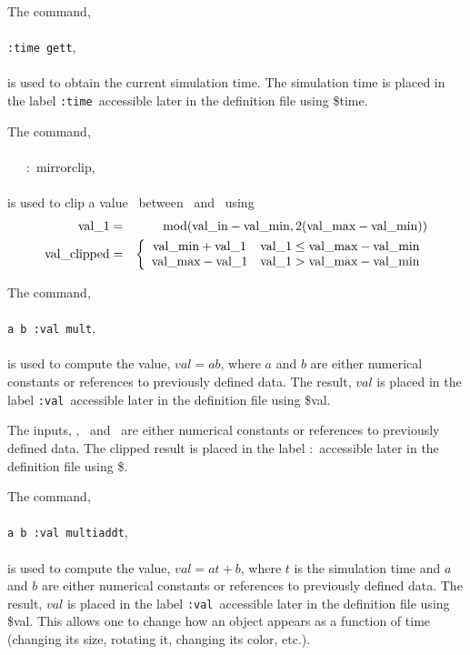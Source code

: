 \documentclass[11pt,twoside]{book}
\newcommand{\hitem}[1]{\item[{\bf #1} \hfill]}
\begin{document}
\hitem{gett}
The command, \\
\\
{\tt :time gett}, \\
\\
is used to obtain the current simulation time.
The simulation time is placed in the label {\tt :time}\ accessible later
in the definition file using \$time.

\hitem{mirrorclip}
The command, \\
\\
\valin\ \valmin\ \valmax\ :\valclipped\ mirrorclip, \\
\\
is used to clip a value \valin\ between \valmin\
and \valmax\ using
\begin{eqnarray}
{\tt \mbox{val\_1}}&=&\mbox{mod}( {\tt \mbox{val\_in}}-{\tt \mbox{val\_min}},2({\tt \mbox{val\_max}}-{\tt \mbox{val\_min}}) )\\
{\tt \mbox{val\_clipped}}&=&\left\{
\begin{array}{cc}
  {\tt \mbox{val\_min}}+{\tt \mbox{val\_1}} & {\tt \mbox{val\_1}}\le {\tt \mbox{val\_max}}-{\tt \mbox{val\_min}} \\
  {\tt \mbox{val\_max}}-{\tt \mbox{val\_1}} & {\tt \mbox{val\_1}}> {\tt \mbox{val\_max}}-{\tt \mbox{val\_min}}
\end{array}
\right.
\end{eqnarray}

\hitem{mult}
The command, \\
\\
{\tt a b :val mult}, \\
\\
is used to compute the value, $val=ab$, where $a$ and $b$ are either
numerical constants or references to previously defined data.
The result, $val$ is placed in the label {\tt :val}\ accessible
later in the definition file using \$val.

\noindent The inputs, \valin, \valmin\ and \valmax\ are either
numerical constants or references to previously defined data.
The clipped result is placed in the label :\valclipped\ accessible
later in the definition file using \$\valclipped.

\hitem{multiaddt}
The command, \\
\\
{\tt a b :val multiaddt}, \\
\\
is used to compute the value, $val=at+b$, where $t$ is the simulation
time and $a$ and $b$ are either numerical constants or references to
previously defined data. The result, $val$ is placed in the label
{\tt :val}\ accessible later in the definition file using \$val.
This allows one to change how an object appears as a function of
time (changing its size, rotating it, changing its color, etc.).
\end{document}
